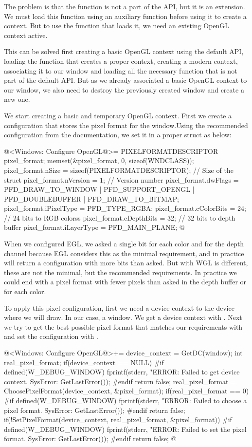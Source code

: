 The problem is that the
function  is not a part of the
API, but it is an extension. We must load this function using an
auxiliary function before using it to create a context. But to use the
function that loads it, we need an existing OpenGL context active.

This can be solved first creating a basic OpenGL context using the
default API, loading the function that creates a proper context,
creating a modern context, associating it to our window and loading
all the necessary function that is not part of the default API. But as
we already associated a basic OpenGL context to our window, we also
need to destroy the previously created window and create a new one.

We start creating a basic and temporary OpenGL context. First we
create a configuration that stores the pixel format for the
window.Using the recommended configuration from the documentation, we
set it in a proper struct as below:

\iniciocodigo
@<Windows: Configure OpenGL@>=
PIXELFORMATDESCRIPTOR pixel_format;
memset(&pixel_format, 0, sizeof(WNDCLASS));
pixel_format.nSize = sizeof(PIXELFORMATDESCRIPTOR); // Size of the struct
pixel_format.nVersion = 1; // Version number
pixel_format.dwFlags = PFD_DRAW_TO_WINDOW | PFD_SUPPORT_OPENGL |
                       PFD_DOUBLEBUFFER | PFD_DRAW_TO_BITMAP;
pixel_format.iPixelType = PFD_TYPE_RGBA;
pixel_format.cColorBits = 24; // 24 bits to RGB colorss
pixel_format.cDepthBits = 32; // 32 bits to depth buffer
pixel_format.iLayerType = PFD_MAIN_PLANE;
@
\fimcodigo

When we configured EGL, we asked a single bit for each color and for
the depth channel because EGL considers this as the minimal
requirement, and in practice will return a configuration with more
bits than asked. But with WGL is different, these are not the minimal,
but the recommended requirements. In practice we could end with a
pixel format with fewer pixels than asked in the depth buffer or for
each color.

To apply this pixel configuration, first we need a device context to
the device where we will draw. In our case, a window. We get a device
context with . Next we try to get the best possible
pixel format that matches our requirements
with  and set the configuration with
.

\iniciocodigo
@<Windows: Configure OpenGL@>+=
{
  device_context = GetDC(window);
  int real_pixel_format;
  if(device_context == NULL){
#if defined(W_DEBUG_WINDOW)
    fprintf(stderr, "ERROR: Failed to get device context. SysError: %
            GetLastError());
#endif
    return false;
  }
  real_pixel_format = ChoosePixelFormat(device_context, &pixel_format);
  if(real_pixel_format == 0){
#if defined(W_DEBUG_WINDOW)
    fprintf(stderr, "ERROR: Failed to choose a pixel format. SysError: %
            GetLastError());
#endif
    return false;
  }
  if(!SetPixelFormat(device_context, real_pixel_format, &pixel_format)){
#if defined(W_DEBUG_WINDOW)
    fprintf(stderr, "ERROR: Failed to set the pixel format. SysError: %
            GetLastError());
#endif
    return false;
  }
}
@
\fimcodigo

